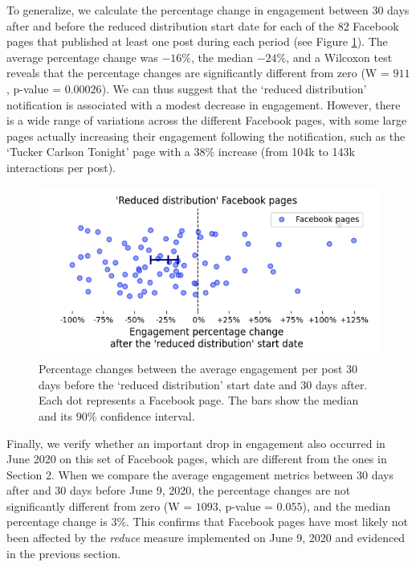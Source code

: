 \documentclass[11pt,a4paper]{article}
\begin{document}
To generalize, we calculate the percentage change in engagement between 30 days after and before the reduced distribution start date for each of the 82 Facebook pages that published at least one post during each period (see Figure \ref{reduce_percentage_change}).
The average percentage change was $-16\%$, the median $-24\%$, and a Wilcoxon test reveals that the percentage changes are significantly different from zero (W = $911$, p-value = $0.00026$).
We can thus suggest that the `reduced distribution' notification is associated with a modest decrease in engagement. 
However, there is a wide range of variations across the different Facebook pages, with some large pages actually increasing their engagement following the notification, such as the `Tucker Carlson Tonight' page with a $38\%$ increase (from 104k to 143k interactions per post).

\begin{figure}[!h]
\centering
\includegraphics[width=\linewidth]{./../figure/reduce_percentage_change.png}
\caption{Percentage changes between the average engagement per post 30 days before the `reduced distribution' start date and 30 days after. Each dot represents a Facebook page. The bars show the median and its $90\%$ confidence interval.}
\label{reduce_percentage_change}
\end{figure}
 
Finally, we verify whether an important drop in engagement also occurred in June 2020 on this set of Facebook pages, which are different from the ones in Section 2.
When we compare the average engagement metrics between 30 days after and 30 days before June 9, 2020, the percentage changes are not significantly different from zero (W = $1093$, p-value = $0.055$), and the median percentage change is $3\%$.
This confirms that Facebook pages have most likely not been affected by the {\it reduce} measure implemented on June 9, 2020 and evidenced in the previous section.
\end{document}
